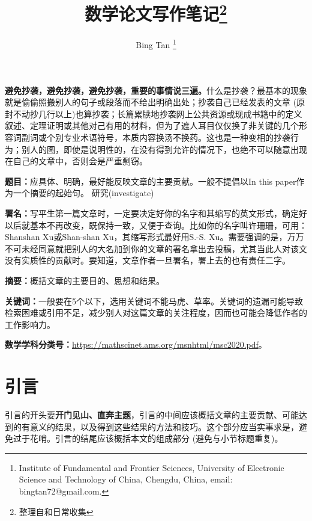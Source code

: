 \documentclass[11pt,final]{article}
\title{数学论文写作笔记\footnote{整理自\cite{tang2013}和日常收集}}
\author{Bing Tan \thanks {Institute of Fundamental and Frontier Sciences, University of Electronic Science and Technology of China, Chengdu, China,
email: bingtan72@gmail.com.}}
\numberwithin{equation}{section}
\begin{document}
	\maketitle

\textbf{避免抄袭，避免抄袭，避免抄袭，重要的事情说三遍。}什么是抄袭？最基本的现象就是偷偷照搬别人的句子或段落而不给出明确出处；抄袭自己已经发表的文章 (原封不动抄几行以上)也算抄袭；长篇累牍地抄袭网上公共资源或现成书籍中的定义叙述、定理证明或其他对己有用的材料，但为了遮人耳目仅仅换了非关键的几个形容词副词或个别专业术语符号，本质内容换汤不换药。这也是一种变相的抄袭行为；别人的图，即使是说明性的，在没有得到允许的情况下，也绝不可以随意出现在自己的文章中，否则会是严重剽窃。

	
\textbf{题目：}应具体、明确，最好能反映文章的主要贡献。一般不提倡以In this paper作为一个摘要的起始句。 研究(investigate)

\textbf{署名：}写平生第一篇文章时，一定要决定好你的名字和其缩写的英文形式，确定好以后就基本不再改变，既保持一致，又便于查询。比如你的名字叫许珊珊，可用：Shanshan Xu或Shan-shan Xu，其缩写形式最好用S.-S. Xu。需要强调的是，万万不可未经同意就把别人的大名加到你的文章的署名拿出去投稿，尤其当此人对该文没有实质性的贡献时。要知道，文章作者一旦署名，署上去的也有责任二字。

\textbf{摘要：}概括文章的主要目的、思想和结果。

\textbf{关键词：}一般要在5个以下，选用关键词不能马虎、草率。关键词的遗漏可能导致检索困难或引用不足，减少别人对这篇文章的关注程度，因而也可能会降低作者的工作影响力。

\textbf{数学学科分类号：}\url{https://mathscinet.ams.org/msnhtml/msc2020.pdf}。
\section{引言}
引言的开头要\textbf{开门见山、直奔主题}，引言的中间应该概括文章的主要贡献、可能达到的有意义的结果，以及得到这些结果的方法和技巧。这个部分应当实事求是，避免过于花哨。引言的结尾应该概括本文的组成部分 (避免与小节标题重复)。
\end{document}
